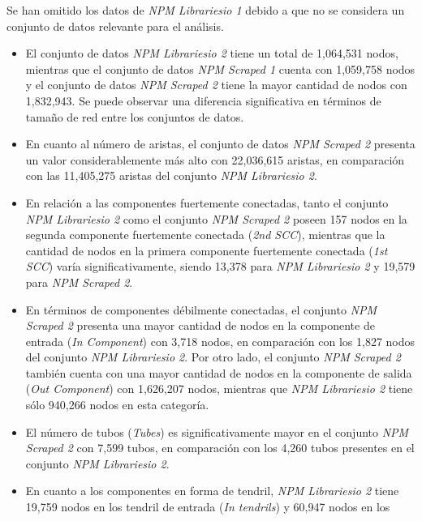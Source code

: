 Se han omitido los datos de \textit{NPM Librariesio 1} debido a que no se considera un conjunto
de datos relevante para el análisis.

\begin{itemize}
    \item El conjunto de datos \textit{NPM Librariesio 2} tiene un total de 1,064,531 nodos,
          mientras que el conjunto de datos \textit{NPM Scraped 1} cuenta con 1,059,758 nodos y el
          conjunto de datos \textit{NPM Scraped 2} tiene la mayor cantidad de nodos con 1,832,943.
          Se puede observar una diferencia significativa en términos de tamaño de red entre los
          conjuntos de datos.
    \item En cuanto al número de aristas, el conjunto de datos \textit{NPM Scraped 2} presenta
          un valor considerablemente más alto con 22,036,615 aristas, en comparación con las
          11,405,275 aristas del conjunto \textit{NPM Librariesio 2}.
    \item En relación a las componentes fuertemente conectadas, tanto el conjunto
          \textit{NPM Librariesio 2} como el conjunto \textit{NPM Scraped 2} poseen 157 nodos en
          la segunda componente fuertemente conectada (\textit{2nd SCC}), mientras que la cantidad
          de nodos en la primera componente fuertemente conectada (\textit{1st SCC}) varía
          significativamente, siendo 13,378 para \textit{NPM Librariesio 2} y 19,579 para
          \textit{NPM Scraped 2}.
    \item En términos de componentes débilmente conectadas, el conjunto \textit{NPM Scraped 2}
          presenta una mayor cantidad de nodos en la componente de entrada (\textit{In Component})
          con 3,718 nodos, en comparación con los 1,827 nodos del conjunto \textit{NPM Librariesio 2}.
          Por otro lado, el conjunto \textit{NPM Scraped 2} también cuenta con una mayor cantidad de
          nodos en la componente de salida (\textit{Out Component}) con 1,626,207 nodos, mientras
          que \textit{NPM Librariesio 2} tiene sólo 940,266 nodos en esta categoría.
    \item El número de tubos (\textit{Tubes}) es significativamente mayor en el conjunto
          \textit{NPM Scraped 2} con 7,599 tubos, en comparación con los 4,260 tubos presentes en
          el conjunto \textit{NPM Librariesio 2}.
    \item En cuanto a los componentes en forma de tendril, \textit{NPM Librariesio 2} tiene
          19,759 nodos en los tendril de entrada (\textit{In tendrils}) y 60,947 nodos en los

\end{itemize}
